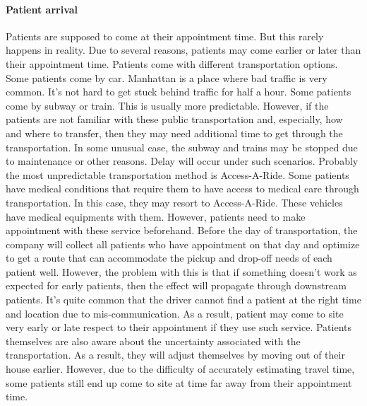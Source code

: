 \paragraph{Patient arrival} Patients are supposed to come at their appointment time. But this rarely happens in reality. Due to several reasons, patients may come earlier or later than their appointment time. Patients come with different transportation options. Some patients come by car. Manhattan is a place where bad traffic is very common. It's not hard to get stuck behind traffic for half a hour. Some patients come by subway or train. This is usually more predictable. However, if the patients are not familiar with these public transportation and, especially, how and where to transfer, then they may need additional time to get through the transportation. In some unusual case, the subway and trains may be stopped due to maintenance or other reasons. Delay will occur under such scenarios. Probably the most unpredictable transportation method is Access-A-Ride. Some patients have medical conditions that require them to have access to medical care through transportation. In this case, they may resort to Access-A-Ride. These vehicles have medical equipments with them. However, patients need to make appointment with these service beforehand. Before the day of transportation, the company will collect all patients who have appointment on that day and optimize to get a route that can accommodate the pickup and drop-off needs of each patient well. However, the problem with this is that if something doesn't work as expected for early patients, then the effect will propagate through downstream patients. It's quite common that the driver cannot find a patient at the right time and location due to mis-communication. As a result, patient may come to site very early or late respect to their appointment if they use such service. Patients themselves are also aware about the uncertainty associated with the transportation. As a result, they will adjust themselves by moving out of their house earlier. However, due to the difficulty of accurately estimating travel time, some patients still end up come to site at time far away from their appointment time.

